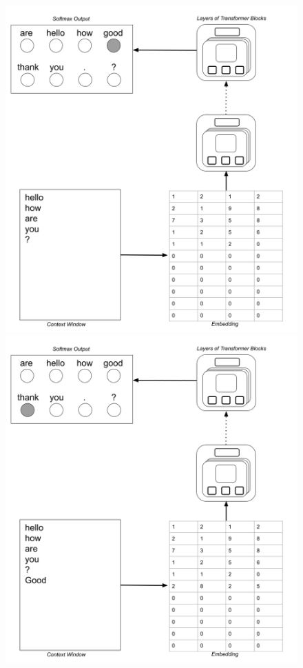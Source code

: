 \begin{figure}[ht]
\centering
\includegraphics[scale=.2]{./images/TransformerOverview.png} \; \; \; 
\includegraphics[scale=.2]{./images/TransformerOverview2.png}

\end{figure}
